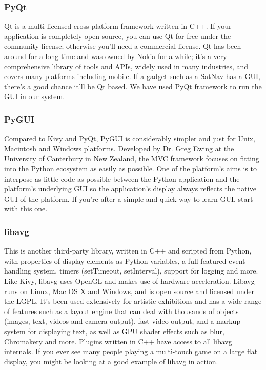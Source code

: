 \documentclass[a4paper,12pt]{article}
\begin{document}
\subsubsection*{PyQt}
Qt is a multi-licensed cross-platform framework written in C++. If your application is completely open source, you can use Qt 
for free under the community license; otherwise you’ll need a commercial license. Qt has been around for a long time and was owned 
by Nokia for a while; it’s a very comprehensive library of tools and APIs, widely used in many industries, and covers many platforms 
including mobile. If a gadget such as a SatNav has a GUI, there’s a good chance it’ll be Qt based.
\newline We have used PyQt framework to run the GUI in our system.

\subsubsection*{PyGUI}
Compared to Kivy and PyQt, PyGUI is considerably simpler and just for Unix, Macintosh and Windows platforms. Developed 
by Dr. Greg Ewing at the University of Canterbury in New Zealand, the MVC framework focuses on fitting into the Python ecosystem
as easily as possible.
One of the platform’s aims is to interpose as little code as possible between the Python application and the platform’s 
underlying GUI so the application’s display always reflects the native GUI of the platform. If you’re after a simple and quick 
way to learn GUI, start with this one.

\subsubsection*{libavg}
This is another third-party library, written in C++ and scripted from Python, with properties of display elements as Python 
variables, a full-featured event handling system, timers (setTimeout, setInterval), support for logging and more. Like Kivy, libavg 
uses OpenGL and makes use of hardware acceleration.
Libavg runs on Linux, Mac OS X and Windows, and is open source and licensed under the LGPL. It’s been used extensively for 
artistic exhibitions and has a wide range of features such as a layout engine that can deal with thousands of objects 
(images, text, videos and camera output), fast video output, and a markup system for displaying text, as well as GPU shader
effects such as blur, Chromakery and more. Plugins written in C++ have access to all libavg internals.
If you ever see many people playing a multi-touch game on a large flat display, you might be looking at a good example of 
libavg in action.
\end{document}

